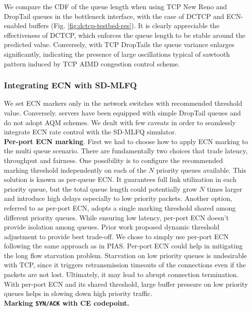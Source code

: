We compare the CDF of the queue length when using TCP New Reno and DropTail queues in the bottleneck interface, with the case of DCTCP and ECN-enabled buffers (Fig. \ref{fig:dctcp-testbed-res}).  
It is clearly appreciable the effectiveness of DCTCP, which enforces the queue length to be stable around the predicted value. Conversely, with TCP DropTails the queue variance enlarges significantly, indicating the presence of large oscillations typical of sawtooth pattern induced by TCP AIMD congestion control scheme.
\subsubsection{Integrating ECN with SD-MLFQ}
We set ECN markers only in the network switches with recommended \cite{dctcp} threshold value. Conversely. servers have been equipped with simple DropTail queues and do not adopt AQM schemes. We dealt with few caveats in order to seamlessly integrate ECN rate control with the SD-MLFQ simulator. \\
\textbf{Per-port ECN marking}. First we had to choose how to apply ECN marking to the multi queue scenario. There are fundamentally two choices that trade latency, throughput and fairness. One possibility is to configure the recommended marking threshold independently on each of the $N$ priority queues available. This solution is known as per-queue ECN. It guarantees full link utilization in each priority queue, but the total queue length could potentially grow $N$ times larger and introduce high delays especially to low priority packets. Another option, referred to as per-port ECN, adopts a single marking threshold shared among different priority queues. While ensuring low latency, per-port ECN doesn't provide isolation among queues. Prior work \cite{mqecn} proposed dynamic threshold adjustment to provide best trade-off. We chose to simply use per-port ECN following the same approach as in PIAS. Per-port ECN could help in mitigating the long flow starvation problem. Starvation on low priority queues is undesirable with TCP, since it triggers retransmission timeouts of the connections even if the packets are not lost. Ultimately, it may lead to abrupt connection termination. With per-port ECN and its shared threshold, large buffer pressure on low priority queues helps in slowing down high priority traffic. \\
\textbf{Marking \texttt{SYN/ACK} with CE codepoint.}
